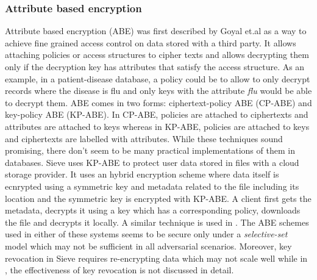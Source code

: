 \subsubsection{Attribute based encryption}
Attribute based encryption (ABE) \cite{abe} was first described by Goyal et.al as a way to achieve fine grained access control on data stored with a third party. It allows attaching policies or access structures to cipher texts and allows decrypting them only if the decryption key has attributes that satisfy the access structure. As an example, in a patient-disease database, a policy could be to allow to only decrypt records where the disease is flu and only keys with the attribute \textit{flu} would be able to decrypt them. ABE comes in two forms: ciphertext-policy ABE (CP-ABE) and key-policy ABE (KP-ABE). In CP-ABE, policies are attached to ciphertexts and attributes are attached to keys whereas in KP-ABE, policies are attached to keys and ciphertexts are labelled with attributes. While these techniques sound promising, there don't seem to be many practical implementations of them in databases. Sieve \cite{sieve} uses KP-ABE to protect user data stored in files with a cloud storage provider. It uses an hybrid encryption scheme where data itself is ecnrypted using a symmetric key and metadata related to the file including its location and the symmetric key is encrypted with KP-ABE. A client first gets the metadata, decrypts it using a key which has a corresponding policy, downloads the file and decrypts it locally. A similar technique is used in \cite{PPEHR}. The ABE schemes used in either of these systems seems to be secure only under a \textit{selective-set} model which  may not be sufficient in all adversarial scenarios. Moreover, key revocation in Sieve requires re-encrypting data which may not scale well while in \cite{PPEHR}, the effectiveness of key revocation is not discussed in detail.
\newline\newline
